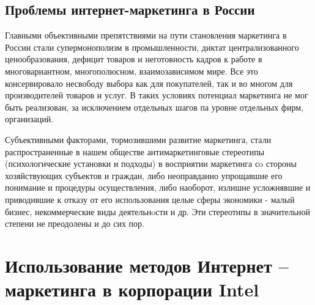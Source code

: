 \documentclass[a4paper,english,russian]{G2-105}
\begin{document}
\section{Проблемы интернет-маркетинга в России}
\par Главными объективными препятствиями на пути становления маркетинга в России стали супермонополизм в промышленности, диктат централизованного ценообразования, дефицит товаров и неготовность кадров к работе в многовариантном, многополюсном, взаимозависимом мире. Все это консервировало несвободу выбора как для покупателей, так и во многом для производителей товаров и услуг. В таких условиях потенциал маркетинга не мог быть реализован, за исключением отдельных шагов па уровне отдельных фирм, организаций.
\par Субъективными факторами, тормозившими развитие маркетинга, стали распространенные в нашем обществе антимаркетинговые стереотипы (психологические установки и подходы) в восприятии маркетинга сo стороны хозяйствующих субъектов и граждан, либо неоправданно упрощавшие его понимание и процедуры осуществления, либо наоборот, излишне усложнявшие и приводившие к отказу от его использования целые сферы экономики - малый бизнес, некоммерческие виды деятельнoсти и др. Эти стереотипы в значительной степени не преодолены и до сих пор.

\newpage

\chapter{Использование методов Интернет – маркетинга в корпорации Intel}
\end{document}
